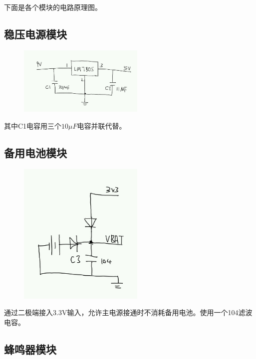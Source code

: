 \documentclass[a4paper,11pt,UTF8]{ctexart}
\newcommand{\bottomcaption}{%
\setlength{\abovecaptionskip}{6bp}%
\setlength{\belowcaptionskip}{6bp}%
\caption}
\newcommand{\xiaowuhao}{\fontsize{9bp}{9bp}\selectfont}   %
\begin{document}
下面是各个模块的电路原理图。

\subsection{稳压电源模块}

\begin{figure}[!htbp]
    \centering
    \includegraphics[width=6cm]{image2.png}
    \bottomcaption{\xiaowuhao{稳压电源模块原理图}}
\end{figure}

其中C1电容用三个$10μF$电容并联代替。

\subsection{备用电池模块}

\begin{figure}[!htbp]
    \centering
    \includegraphics[width=6cm]{image3.png}
    \bottomcaption{\xiaowuhao{备用电池模块原理图}}
\end{figure}

通过二极端接入3.3V输入，允许主电源接通时不消耗备用电池。使用一个104滤波电容。

\subsection{蜂鸣器模块}
\end{document}
